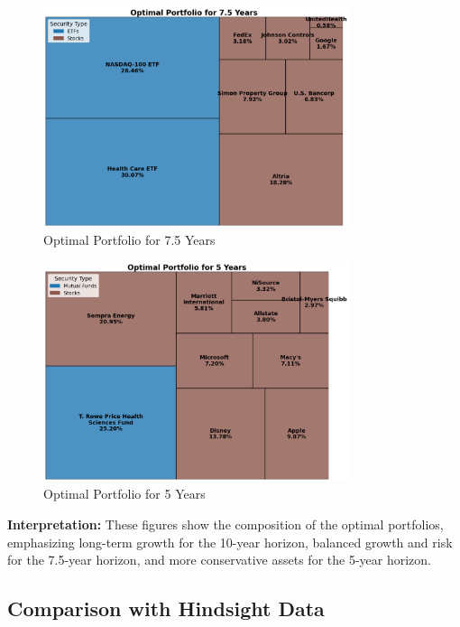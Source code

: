 \begin{figure}[!htbp]
    \centering
    \includegraphics[width=0.8\textwidth]{../Figures/optimal_portfolio_7_5_years.png}
    \caption{Optimal Portfolio for 7.5 Years}
    \label{fig:optimal_portfolio_7_5y}
\end{figure}

\begin{figure}[!htbp]
    \centering
    \includegraphics[width=0.8\textwidth]{../Figures/optimal_portfolio_5_years.png}
    \caption{Optimal Portfolio for 5 Years}
    \label{fig:optimal_portfolio_5y}
\end{figure}

\textbf{Interpretation:} These figures show the composition of the optimal portfolios, emphasizing long-term growth for the 10-year horizon, balanced growth and risk for the 7.5-year horizon, and more conservative assets for the 5-year horizon.

\subsection{Comparison with Hindsight Data}

